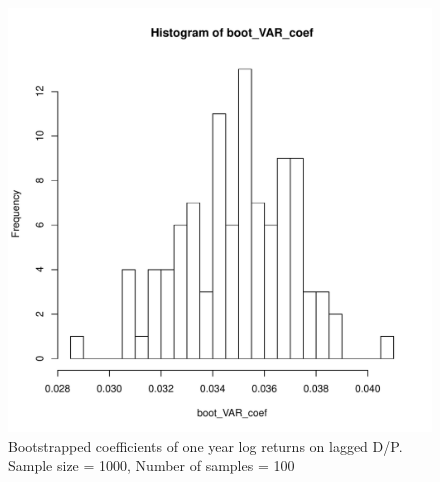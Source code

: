 \documentclass[11pt,letter]{article}
\begin{document}
\begin{figure}[!htb]
	\centering
	\includegraphics[scale = 0.5]{boot_VAR_coef.pdf}
	\caption{Bootstrapped coefficients of one year log returns on lagged D/P. Sample size = 1000, Number of samples = 100}
	\label{fig:boot_VAR_coef}
\end{figure}

\end{document}
